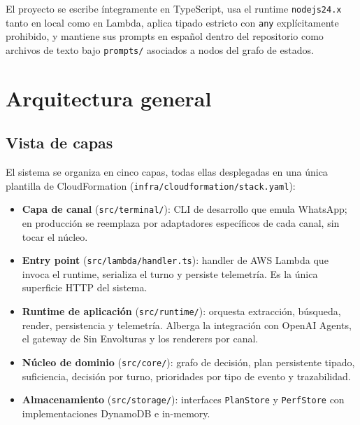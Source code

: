 \documentclass[11pt,a4paper]{article}
\begin{document}
El proyecto se escribe íntegramente en TypeScript, usa el runtime
\texttt{nodejs24.x} tanto en local como en Lambda, aplica tipado estricto con
\texttt{any} explícitamente prohibido, y mantiene sus prompts en español
dentro del repositorio como archivos de texto bajo \texttt{prompts/}
asociados a nodos del grafo de estados.

\section{Arquitectura general}

\subsection{Vista de capas}

El sistema se organiza en cinco capas, todas ellas desplegadas en una única
plantilla de CloudFormation (\texttt{infra/cloudformation/stack.yaml}):

\begin{itemize}[leftmargin=*,itemsep=2pt]
  \item \textbf{Capa de canal} (\texttt{src/terminal/}): CLI de desarrollo
        que emula WhatsApp; en producción se reemplaza por adaptadores
        específicos de cada canal, sin tocar el núcleo.
  \item \textbf{Entry point} (\texttt{src/lambda/handler.ts}): handler de
        AWS Lambda que invoca el runtime, serializa el turno y persiste
        telemetría. Es la única superficie HTTP del sistema.
  \item \textbf{Runtime de aplicación} (\texttt{src/runtime/}): orquesta
        extracción, búsqueda, render, persistencia y telemetría. Alberga
        la integración con OpenAI Agents, el gateway de Sin Envolturas y
        los renderers por canal.
  \item \textbf{Núcleo de dominio} (\texttt{src/core/}): grafo de
        decisión, plan persistente tipado, suficiencia, decisión por
        turno, prioridades por tipo de evento y trazabilidad.
  \item \textbf{Almacenamiento} (\texttt{src/storage/}): interfaces
        \texttt{PlanStore} y \texttt{PerfStore} con implementaciones
        DynamoDB e in-memory.
\end{itemize}
\end{document}

